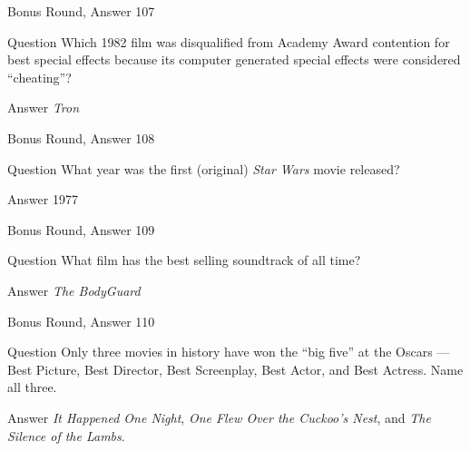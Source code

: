 \documentclass[11pt]{beamer}
\begin{document}
\begin{frame}[t]{Bonus Round, Answer 107}
\vspace{2em}
\begin{block}{Question}
Which 1982 film was disqualified from Academy Award contention for best special effects because its computer generated special effects were considered ``cheating''?
\end{block}
\pause{}
\begin{block}{Answer}
\emph{Tron}
\end{block}
\end{frame}
    

\begin{frame}[t]{Bonus Round, Answer 108}
\vspace{2em}
\begin{block}{Question}
What year was the first (original) \emph{Star Wars} movie released?
\end{block}
\pause{}
\begin{block}{Answer}
1977
\end{block}
\end{frame}
    

\begin{frame}[t]{Bonus Round, Answer 109}
\vspace{2em}
\begin{block}{Question}
What film has the best selling soundtrack of all time?
\end{block}
\pause{}
\begin{block}{Answer}
\emph{The BodyGuard}
\end{block}
\end{frame}
    

\begin{frame}[t]{Bonus Round, Answer 110}
\vspace{2em}
\begin{block}{Question}
Only three movies in history have won the ``big five'' at the Oscars — Best Picture, Best Director, Best Screenplay, Best Actor, and Best Actress. Name all three.
\end{block}
\pause{}
\begin{block}{Answer}
\emph{It Happened One Night}, \emph{One Flew Over the Cuckoo's Nest}, and \emph{The Silence of the Lambs}.
\end{block}
\end{frame}
    

\section*{\ }
\end{document}
